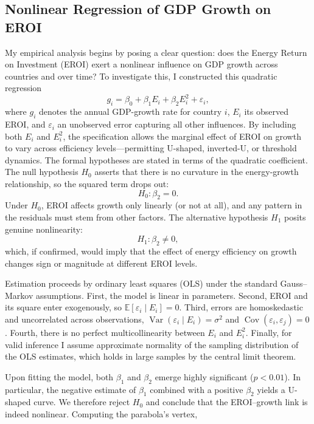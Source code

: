 \documentclass[a4paper,12pt]{article}
\begin{document}
\subsection{Nonlinear Regression of GDP Growth on EROI}
My empirical analysis begins by posing a clear question: does the Energy Return on Investment (EROI) exert a nonlinear influence on GDP growth across countries and over time? To investigate this, I constructed this quadratic regression
\begin{equation}
g_i = \beta_{0} + \beta_{1} E_{i} + \beta_{2} E_{i}^{2} + \varepsilon_{i},
\end{equation}
where \( g_i \) denotes the annual GDP-growth rate for country \( i \), \( E_i \) its observed EROI, and \( \varepsilon_i \) an unobserved error capturing all other influences. By including both \( E_i \) and \( E_i^2 \), the specification allows the marginal effect of EROI on growth to vary across efficiency levels—permitting U-shaped, inverted-U, or threshold dynamics.
The formal hypotheses are stated in terms of the quadratic coefficient. The null hypothesis \( H_{0} \) asserts that there is no curvature in the energy-growth relationship, so the squared term drops out:
\begin{equation}
H_{0}: \beta_{2} = 0.
\end{equation}
Under \( H_{0} \), EROI affects growth only linearly (or not at all), and any pattern in the residuals must stem from other factors. The alternative hypothesis \( H_{1} \) posits genuine nonlinearity:
\begin{equation}
H_{1}: \beta_{2} \neq 0,
\end{equation}
which, if confirmed, would imply that the effect of energy efficiency on growth changes sign or magnitude at different EROI levels.

Estimation proceeds by ordinary least squares (OLS) under the standard Gauss–Markov assumptions. First, the model is linear in parameters. Second, EROI and its square enter exogenously, so \( \mathbb{E}[\varepsilon_i \mid E_i] = 0 \). Third, errors are homoskedastic and uncorrelated across observations, \( \operatorname{Var}(\varepsilon_i \mid E_i) = \sigma^2 \) and \( \operatorname{Cov}(\varepsilon_i, \varepsilon_j) = 0 \). Fourth, there is no perfect multicollinearity between \( E_i \) and \( E_i^2 \). Finally, for valid inference I assume approximate normality of the sampling distribution of the OLS estimates, which holds in large samples by the central limit theorem.

Upon fitting the model, both \( \beta_{1} \) and \( \beta_{2} \) emerge highly significant (\( p < 0.01 \)). In particular, the negative estimate of \( \beta_{1} \) combined with a positive \( \beta_{2} \) yields a U-shaped curve. We therefore reject \( H_{0} \) and conclude that the EROI–growth link is indeed nonlinear. Computing the parabola’s vertex,
\end{document}
